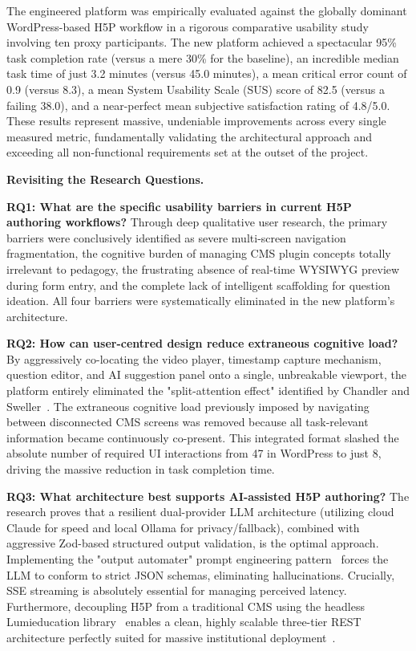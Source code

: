 The engineered platform was empirically evaluated against the globally dominant WordPress-based H5P workflow in a rigorous comparative usability study involving ten proxy participants. The new platform achieved a spectacular 95\% task completion rate (versus a mere 30\% for the baseline), an incredible median task time of just 3.2 minutes (versus 45.0 minutes), a mean critical error count of 0.9 (versus 8.3), a mean System Usability Scale (SUS) score of 82.5 (versus a failing 38.0), and a near-perfect mean subjective satisfaction rating of 4.8/5.0. These results represent massive, undeniable improvements across every single measured metric, fundamentally validating the architectural approach and exceeding all non-functional requirements set at the outset of the project.

\textbf{Revisiting the Research Questions.}

\textbf{RQ1: What are the specific usability barriers in current H5P authoring workflows?}
Through deep qualitative user research, the primary barriers were conclusively identified as severe multi-screen navigation fragmentation, the cognitive burden of managing CMS plugin concepts totally irrelevant to pedagogy, the frustrating absence of real-time WYSIWYG preview during form entry, and the complete lack of intelligent scaffolding for question ideation. All four barriers were systematically eliminated in the new platform's architecture.

\textbf{RQ2: How can user-centred design reduce extraneous cognitive load?}
By aggressively co-locating the video player, timestamp capture mechanism, question editor, and AI suggestion panel onto a single, unbreakable viewport, the platform entirely eliminated the "split-attention effect" identified by Chandler and Sweller~\cite{chandler1991}. The extraneous cognitive load previously imposed by navigating between disconnected CMS screens was removed because all task-relevant information became continuously co-present. This integrated format slashed the absolute number of required UI interactions from 47 in WordPress to just 8, driving the massive reduction in task completion time.

\textbf{RQ3: What architecture best supports AI-assisted H5P authoring?}
The research proves that a resilient dual-provider LLM architecture (utilizing cloud Claude for speed and local Ollama for privacy/fallback), combined with aggressive Zod-based structured output validation, is the optimal approach. Implementing the "output automater" prompt engineering pattern~\cite{white2023} forces the LLM to conform to strict JSON schemas, eliminating hallucinations. Crucially, SSE streaming is absolutely essential for managing perceived latency. Furthermore, decoupling H5P from a traditional CMS using the headless Lumieducation library~\cite{lumieducation2023} enables a clean, highly scalable three-tier REST architecture perfectly suited for massive institutional deployment~\cite{bass2012}.

